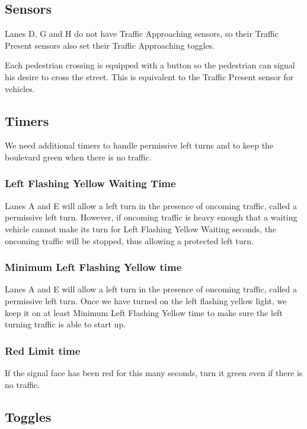 \documentclass[letterpaper,twoside]{article}
\begin{document}
\subsection{Sensors}

Lanes D, G and H do not have Traffic Approaching sensors, so their
Traffic Present sensors also set their Traffic Approaching toggles.

Each pedestrian crossing is equipped with a button so the pedestrian can
signal his desire to cross the street.  This is equivalent to the
Traffic Present sensor for vehicles.

\subsection{Timers}

We need additional timers to handle permissive left turns and to
keep the boulevard green when there is no traffic.

\subsubsection{Left Flashing Yellow Waiting Time}

Lanes A and E will allow a left turn in the presence of oncoming traffic,
called a permissive left turn. However, if oncoming traffic is heavy enough
that a waiting vehicle cannot make its turn for Left Flashing Yellow Waiting
seconds, the oncoming traffic will be stopped, thus allowing a protected left
turn.

\subsubsection{Minimum Left Flashing Yellow time}

Lanes A and E will allow a left turn in the presence of oncoming traffic,
called a permissive left turn. Once we have turned on the left flashing
yellow light, we keep it on at least Minimum Left Flashing Yellow time
to make sure the left turning traffic is able to start up.

\subsubsection{Red Limit time}
If the signal face has been red for this many seconds, turn it green
even if there is no traffic.

\subsection{Toggles}
\end{document}
